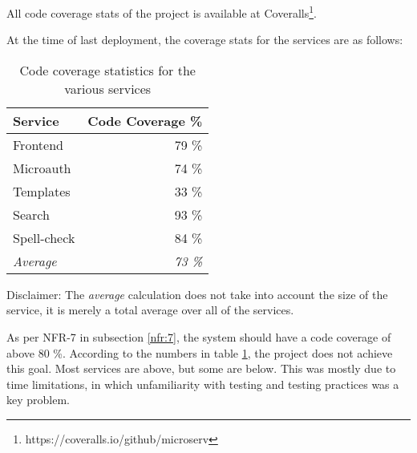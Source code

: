 All code coverage stats of the project is available at Coveralls\footnote{https://coveralls.io/github/microserv}.

At the time of last deployment, the coverage stats for the services are as follows:
\begin{table}[H]
    \caption{Code coverage statistics for the various services}
    \label{table:codecoverage}
    \centering
    \begin{tabular}{ | l | r | }
        \hline
        Service & Code Coverage \% \\ \hline
        Frontend & 79 \% \\ \hline
        Microauth & 74 \% \\ \hline
        Templates & 33 \% \\ \hline
        Search & 93 \% \\ \hline
        Spell-check & 84 \% \\ \hline
        \textit{Average} & \textit{73 \%} \\ \hline
    \end{tabular}
\end{table}

Disclaimer: The \textit{average} calculation does not take into account the size of the service, it is merely a total average over all of the services.

As per NFR-7 in subsection \ref{nfr:7}, the system should have a code coverage of above 80 \%. According to the numbers in table \ref{table:codecoverage}, the project does not achieve this goal. Most services are above, but some are below. This was mostly due to time limitations, in which unfamiliarity with testing and testing practices was a key problem. %



